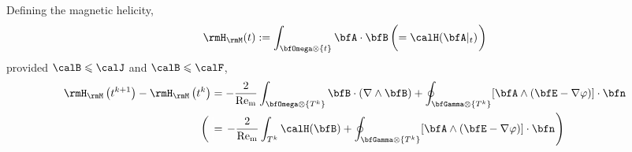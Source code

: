         \begin{theorem*}
            Defining the magnetic helicity,
            \begin{equation}
                \rmH_{\rmM}(t)  :=  \int_{\bfOmega\otimes\{t\}}\bfA\cdot\bfB  \left(=  \calH(\bfA|_{t})\tall\right)
            \end{equation}
            provided $\calB  \leqslant  \calJ$ and $\calB  \leqslant  \calF$,
            \begin{align}
                \rmH_{\rmM}\left(t^{k + 1}\right) - \rmH_{\rmM}\left(t^{k}\right)  &=  - \frac{2}{\rmRem}\int_{\bfOmega\otimes\left\{T^{k}\right\}}\bfB\cdot(\nabla\wedge\bfB) + \oint_{\bfGamma\otimes\left\{T^{k}\right\}}[\bfA\wedge(\bfE - \nabla\varphi)]\cdot\bfn  \\
                \left(\tall\right.&=  \left.- \frac{2}{\rmRem}\int_{T^{k}}\calH(\bfB) + \oint_{\bfGamma\otimes\left\{T^{k}\right\}}[\bfA\wedge(\bfE - \nabla\varphi)]\cdot\bfn\tall\right)
            \end{align}
        \end{theorem*}

